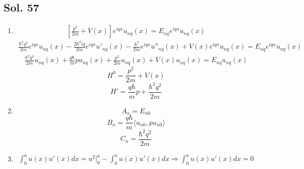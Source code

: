 \subsection*{Sol. 57}
\begin{enumerate}
    \item 
    \begin{align*}
        \left[\frac{p^2}{2m}+V(x)\right] 
        e^{iqx}u_{nq}(x) = E_{nq}e^{iqx}u_{nq}(x)
    \end{align*}
    \begin{align*}
        \frac{\hbar^2q^2}{2m}e^{iqx}u_{nq}(x)
        -\frac{2\hbar^2 iq}{2m}e^{iqx}u'_{nq}(x)
        -\frac{\hbar^2}{2m}e^{iqx}u''_{nq}(x)
        +
        V(x)e^{iqx}u_{nq}(x) = E_{nq}e^{iqx}u_{nq}(x)
    \end{align*}
    \begin{align*}
        \frac{\hbar^2q^2}{2m}u_{nq}(x)
        +\frac{q\hbar}{m}pu_{nq}(x)
        +\frac{p^2}{2m}u_{nq}(x)
        +
        V(x)u_{nq}(x) = E_{nq}u_{nq}(x)
    \end{align*}
    $$
    H^0 = \frac{p^2}{2m} + V(x)
    $$
    $$
    H' = \frac{q\hbar}{m}p + \frac{\hbar^2q^2}{2m}
    $$
    \item 
    $$
    A_n = E_{n0}
    $$
    $$
    B_n = \frac{q\hbar}{m}\langle u_{n0},pu_{n0}\rangle
    $$
    $$
    C_n = \frac{\hbar^2q^2}{2m}
    $$
    \item 
    \begin{align*}
        \int_0^au(x)u'(x)dx = u^2\bigg|^a_0 - \int_0^a u(x)u'(x)dx \Rightarrow \int_0^au(x)u'(x)dx=0
    \end{align*}
    
\end{enumerate}